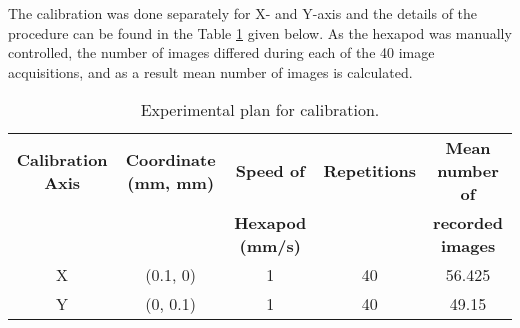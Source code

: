         \noindent The calibration was done separately for X- and Y-axis and the details of the procedure can be found in the Table \ref{table:calibration_plan} given below. As the hexapod was manually controlled, the number of images differed during each of the 40 image acquisitions, and as a result mean number of images is calculated.

        \begin{table}[ht]
            \centering
            \footnotesize
            \begin{tabular}{ccccc}
                \toprule
                \textbf{Calibration Axis} & \textbf{Coordinate (mm, mm)} & \textbf{Speed of} & \textbf{Repetitions} & \textbf{Mean number of} \\
                 & & \textbf{Hexapod (mm/s)} & & \textbf{recorded images} \\
                \midrule
                X & (0.1, 0) & 1 & 40 & 56.425 \\
                Y & (0, 0.1) & 1 & 40 & 49.15 \\
                \bottomrule
            \end{tabular}
            \caption{Experimental plan for calibration.}
            \label{table:calibration_plan}
        \end{table}
    


